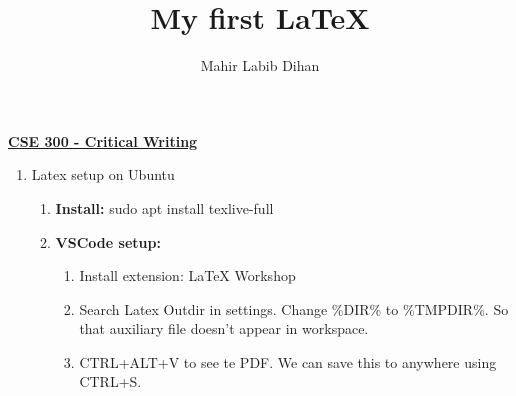 \documentclass[12pt]{article}
\author{Mahir Labib Dihan}
\title{My first LaTeX}
\begin{document}
\begin{Large}
\begin{center}
	\underline{\textbf{CSE 300 - Critical Writing}}\\
\end{center}
\end{Large}

\begin{enumerate}
	\item Latex setup on Ubuntu
	      \begin{enumerate}
		      \item \textbf{Install:} sudo apt install texlive-full
		      \item \textbf{VSCode setup:} 
		      \begin{enumerate}
				\item Install extension: LaTeX Workshop
				\item Search Latex Outdir in settings. Change \%DIR\% to \%TMPDIR\%. So that auxiliary file doesn't appear in workspace. 
				\item CTRL+ALT+V to see te PDF. We can save this to anywhere using CTRL+S.
			  \end{enumerate}
	      \end{enumerate}
\end{enumerate}
\end{document}
